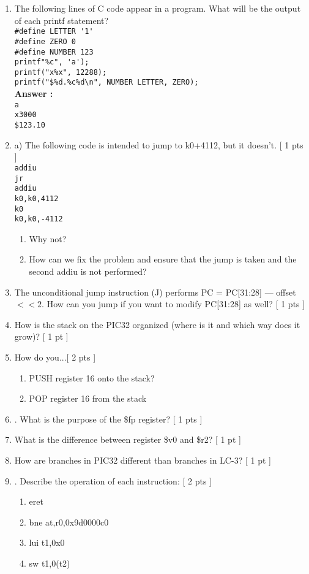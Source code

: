 \documentclass[a4paper,11pt]{article}
\newcommand{\answer}{\textbf{Answer : }}
\begin{document}
\begin{enumerate}
\item The following lines of C code appear in a program. What will be the output of each printf statement? \\
\verb.#define LETTER '1'.  \\
\verb.#define ZERO 0. \\
\verb.#define NUMBER 123 . \\
\verb.printf"%c", 'a'); .\\
\verb.printf("x%x", 12288); .\\
\verb_printf("$%d.%c%d\n", NUMBER LETTER, ZERO); _\\[.2in]
\answer \\
\verb.a. \\
\verb.x3000. \\
\verb_$123.10_ \\
\item a) The following code is intended to jump to k0+4112, but it doesn’t. [ 1 pts ] \\
\verb.addiu. \\
\verb.jr. \\
\verb.addiu. \\
\verb.k0,k0,4112. \\
\verb.k0. \\
\verb.k0,k0,-4112.
\begin{enumerate}
\item Why not?
\item How can we fix the problem and ensure that the jump is taken and the second addiu is
not performed?
\end{enumerate}\item The unconditional jump instruction (J) performs PC = PC[31:28] — offset$<<2$. How can
you jump if you want to modify PC[31:28] as well? [ 1 pts ]
\item How is the stack on the PIC32 organized (where is it and which way does it grow)? [ 1 pt ]
\item How do you...[ 2 pts ]
\begin{enumerate}
\item PUSH register 16 onto the stack?
\item POP register 16 from the stack
\end{enumerate}
\item. What is the purpose of the \$fp register? [ 1 pts ]

\item What is the difference between register \$v0 and \$r2? [ 1 pt ]
\item How are branches in PIC32 different than branches in LC-3? [ 1 pt ]
\item. Describe the operation of each instruction: [ 2 pts ]
\begin{enumerate}
\item eret
\item bne at,r0,0x9d0000c0
\item lui t1,0x0
\item sw t1,0(t2)
\end{enumerate}


\end{enumerate}
\end{document}
